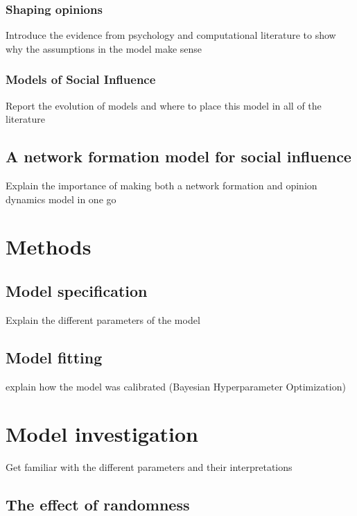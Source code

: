 \documentclass[9pt,twocolumn,twoside]{ilcss}
\begin{document}
\subsubsection{Shaping opinions}

Introduce the evidence from psychology and computational literature to show why the assumptions in the model make sense

\subsubsection{Models of Social Influence}

Report the evolution of models and where to place this model in all of the literature

\subsection{A network formation model for social influence}

Explain the importance of making both a network formation and opinion dynamics model in one go

\section{Methods}

\subsection{Model specification}

Explain the different parameters of the model

\subsection{Model fitting}

explain how the model was calibrated (Bayesian Hyperparameter Optimization)

\section{Model investigation}

Get familiar with the different parameters and their interpretations

\subsection{The effect of randomness}
\end{document}
